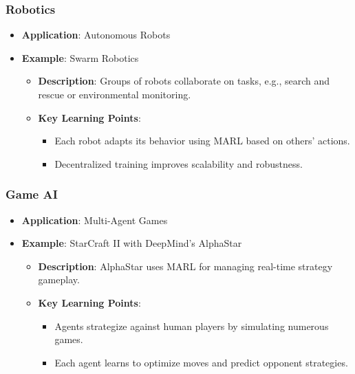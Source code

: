 \documentclass[aspectratio=169]{beamer}
\begin{document}
\begin{frame}[fragile]
    \frametitle{Robotics}
    \begin{itemize}
        \item \textbf{Application}: Autonomous Robots
        \item \textbf{Example}: Swarm Robotics
        \begin{itemize}
            \item \textbf{Description}: Groups of robots collaborate on tasks, e.g., search and rescue or environmental monitoring.
            \item \textbf{Key Learning Points}:
            \begin{itemize}
                \item Each robot adapts its behavior using MARL based on others' actions.
                \item Decentralized training improves scalability and robustness.
            \end{itemize}
        \end{itemize}
    \end{itemize}
\end{frame}

\begin{frame}[fragile]
    \frametitle{Game AI}
    \begin{itemize}
        \item \textbf{Application}: Multi-Agent Games
        \item \textbf{Example}: StarCraft II with DeepMind's AlphaStar
        \begin{itemize}
            \item \textbf{Description}: AlphaStar uses MARL for managing real-time strategy gameplay.
            \item \textbf{Key Learning Points}:
            \begin{itemize}
                \item Agents strategize against human players by simulating numerous games.
                \item Each agent learns to optimize moves and predict opponent strategies.
            \end{itemize}
        \end{itemize}
    \end{itemize}
\end{frame}
\end{document}
